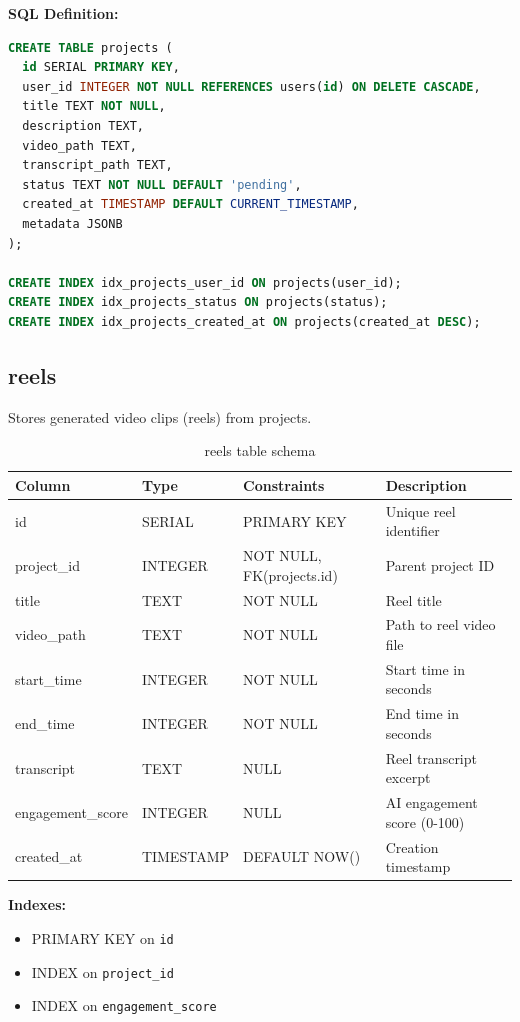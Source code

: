\textbf{SQL Definition:}
\begin{lstlisting}[language=SQL]
CREATE TABLE projects (
  id SERIAL PRIMARY KEY,
  user_id INTEGER NOT NULL REFERENCES users(id) ON DELETE CASCADE,
  title TEXT NOT NULL,
  description TEXT,
  video_path TEXT,
  transcript_path TEXT,
  status TEXT NOT NULL DEFAULT 'pending',
  created_at TIMESTAMP DEFAULT CURRENT_TIMESTAMP,
  metadata JSONB
);

CREATE INDEX idx_projects_user_id ON projects(user_id);
CREATE INDEX idx_projects_status ON projects(status);
CREATE INDEX idx_projects_created_at ON projects(created_at DESC);
\end{lstlisting}

\subsection{reels}

Stores generated video clips (reels) from projects.

\begin{table}[h]
\centering
\begin{tabular}{|l|l|l|p{4cm}|}
\hline
\textbf{Column} & \textbf{Type} & \textbf{Constraints} & \textbf{Description} \\
\hline
id & SERIAL & PRIMARY KEY & Unique reel identifier \\
project\_id & INTEGER & NOT NULL, FK(projects.id) & Parent project ID \\
title & TEXT & NOT NULL & Reel title \\
video\_path & TEXT & NOT NULL & Path to reel video file \\
start\_time & INTEGER & NOT NULL & Start time in seconds \\
end\_time & INTEGER & NOT NULL & End time in seconds \\
transcript & TEXT & NULL & Reel transcript excerpt \\
engagement\_score & INTEGER & NULL & AI engagement score (0-100) \\
created\_at & TIMESTAMP & DEFAULT NOW() & Creation timestamp \\
\hline
\end{tabular}
\caption{reels table schema}
\end{table}

\textbf{Indexes:}
\begin{itemize}
    \item PRIMARY KEY on \texttt{id}
    \item INDEX on \texttt{project\_id}
    \item INDEX on \texttt{engagement\_score}
\end{itemize}

